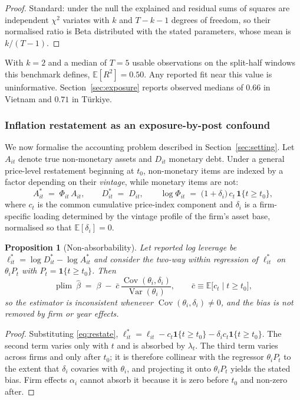 \documentclass[review,12pt,authoryear]{elsarticle}
\theoremstyle{plain}
\newtheorem{proposition}{Proposition}
\theoremstyle{definition}
\newcommand{\E}{\mathbb{E}}
\newcommand{\Var}{\operatorname{Var}}
\newcommand{\Cov}{\operatorname{Cov}}
\newcommand{\plim}{\operatorname*{plim}}
\newcommand{\one}{\mathbf{1}}
\begin{document}
\begin{proof}
Standard: under the null the explained and residual sums of squares are
independent $\chi^2$ variates with $k$ and $T-k-1$ degrees of freedom, so their
normalised ratio is Beta distributed with the stated parameters, whose mean is
$k/(T-1)$. \end{proof}

With $k=2$ and a median of $T=5$ usable observations on the split-half windows
this benchmark defines, $\E[R^2]=0.50$. Any reported fit near this value is
uninformative. Section~\ref{sec:exposure} reports observed medians of $0.66$ in
Vietnam and $0.71$ in T\"{u}rkiye.

\subsubsection{Inflation restatement as an exposure-by-post confound}

We now formalise the accounting problem described in
Section~\ref{sec:setting}. Let $A_{it}$ denote true non-monetary assets and
$D_{it}$ monetary debt. Under a general price-level restatement beginning at
$t_0$, non-monetary items are indexed by a factor depending on their
\emph{vintage}, while monetary items are not:
\begin{equation}
A^{*}_{it} \;=\; \Phi_{it}\,A_{it},
\qquad
D^{*}_{it} \;=\; D_{it},
\qquad
\log\Phi_{it} \;=\; \bigl(1+\delta_i\bigr)\,c_t\,\one\{t\ge t_0\},
\label{eq:restate}
\end{equation}
where $c_t$ is the common cumulative price-index component and $\delta_i$ is a
firm-specific loading determined by the vintage profile of the firm's asset
base, normalised so that $\E[\delta_i]=0$.

\begin{proposition}[Non-absorbability]
\label{prop:restate}
Let reported log leverage be $\ell^{*}_{it}=\log D^{*}_{it}-\log A^{*}_{it}$ and
consider the two-way within regression of $\ell^{*}_{it}$ on
$\theta_i P_t$ with $P_t=\one\{t\ge t_0\}$. Then
\begin{equation}
\plim\ \widehat{\beta}
\;=\;\beta \;-\; \bar{c}\,\frac{\Cov(\theta_i,\delta_i)}{\Var(\theta_i)},
\qquad \bar{c}\equiv\E\bigl[c_t\mid t\ge t_0\bigr],
\end{equation}
so the estimator is inconsistent whenever $\Cov(\theta_i,\delta_i)\neq0$, and
the bias is not removed by firm or year effects.
\end{proposition}

\begin{proof}
Substituting \eqref{eq:restate},
$\ell^{*}_{it}=\ell_{it}-c_t\one\{t\ge t_0\}-\delta_i c_t\one\{t\ge t_0\}$. The
second term varies only with $t$ and is absorbed by $\lambda_t$. The third term
varies across firms and only after $t_0$; it is therefore collinear with the
regressor $\theta_iP_t$ to the extent that $\delta_i$ covaries with $\theta_i$,
and projecting it onto $\theta_iP_t$ yields the stated bias. Firm effects
$\alpha_i$ cannot absorb it because it is zero before $t_0$ and non-zero after.
\end{proof}
\end{document}
